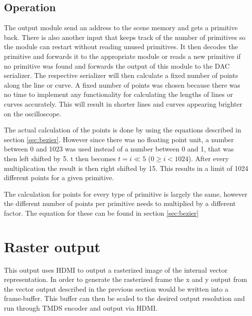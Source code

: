 \subsection{Operation}

The output module send an address to the scene memory and gets a primitive back.
There is also another input that keeps track of the number of primitives so the module can restart without reading unused primitives.
It then decodes the primitive and forwards it to the appropriate module or reads a new primitive if no primitive was found and forwards the output of this module to the DAC serializer.
The respective serializer will then calculate a fixed number of points along the line or curve.
A fixed number of points was chosen because there was no time to implement any functionality for calculating the lengths of lines or curves accurately.
This will result in shorter lines and curves appearing brighter on the oscilloscope.

The actual calculation of the points is done by using the equations described in section \ref{sec:bezier}.
However since there was no floating point unit, a number between 0 and 1023 was used instead of a number between 0 and 1, that was then left shifted by 5.
t then becomes \(t = i \ll 5\) (\(0 \geq i < 1024\)). 
After every multiplication the result is then right shifted by 15.
This results in a limit of 1024 different points for a given primitive.

The calculation for points for every type of primitive is largely the same, however the different number of points per primitive needs to multiplied by a different factor. 
The equation for these can be found in section \ref{sec:bezier}

\section{Raster output}

This output uses HDMI to output a rasterized image of the internal vector representation.
In order to generate the rasterized frame the x and y output from the vector output described in the previous section would be written into a frame-buffer.
This buffer can then be scaled to the desired output resolution and run through TMDS encoder and output via HDMI.